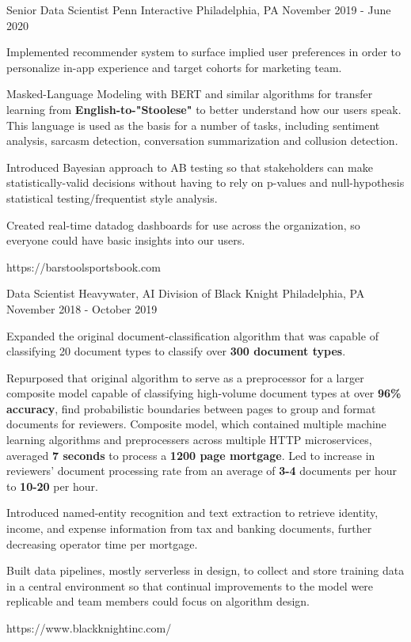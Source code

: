 \begin{cventries}
\cventrylink
{Senior Data Scientist}
{Penn Interactive}
{Philadelphia, PA}
{November 2019 - June 2020}
{ %
\begin{cvitems}
\item{Implemented recommender system to surface implied user preferences in order to personalize in-app experience and target cohorts for marketing team.}
\item{Masked-Language Modeling with BERT and similar algorithms for transfer learning from \textbf{English-to-"Stoolese"} to better understand how our users speak. This language is used as the basis for a number of tasks, including sentiment analysis, sarcasm detection, conversation summarization and collusion detection.}
\item{Introduced Bayesian approach to AB testing so that stakeholders can make statistically-valid decisions without having to rely on p-values and null-hypothesis statistical testing/frequentist style analysis.}
\item{Created real-time datadog dashboards for use across the organization, so everyone could have basic insights into our users.}
\end{cvitems}
}
{https://barstoolsportsbook.com}


\cventrylink
{Data Scientist}
{Heavywater, AI Division of Black Knight}
{Philadelphia, PA}
{November 2018 - October 2019} %
{ %
\begin{cvitems}
\item{Expanded the original document-classification algorithm that was capable of classifying 20 document types to classify over \textbf{300 document types}.}
\item{Repurposed that original algorithm to serve as a preprocessor for a larger composite model capable of classifying high-volume document types at over \textbf{96\% accuracy}, find probabilistic boundaries between pages to group and format documents for reviewers. Composite model, which contained multiple machine learning algorithms and preprocessers across multiple HTTP microservices, averaged \textbf{7 seconds} to process a \textbf{1200 page mortgage}. Led to increase in reviewers' document processing rate from an average of \textbf{3-4} documents per hour to \textbf{10-20} per hour.}
\item{Introduced named-entity recognition and text extraction to retrieve identity, income, and expense information from tax and banking documents, further decreasing operator time per mortgage.}
\item{Built data pipelines, mostly serverless in design, to collect and store training data in a central environment so that continual improvements to the model were replicable and team members could focus on algorithm design.}
\end{cvitems}
}
{https://www.blackknightinc.com/}


\end{cventries}
